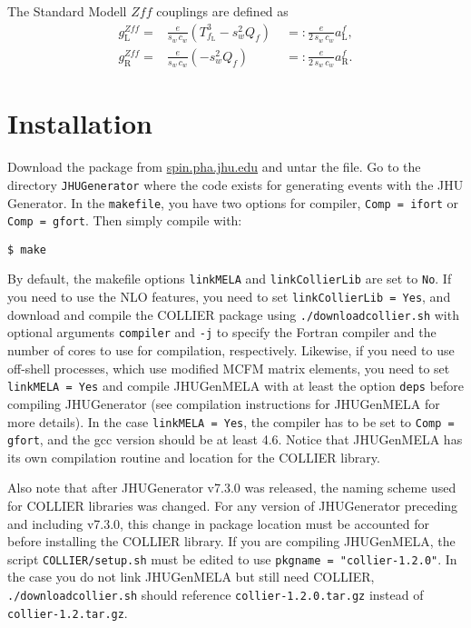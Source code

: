 \documentclass[aps,superscriptaddress,nofootinbib]{revtex4}
\begin{document}
The Standard Modell $Zff$ couplings are defined as 
\begin{eqnarray}
	g_\mathrm{L}^{Zff} =& \frac{e}{s_w \,c_w} \left( T^3_{f_\mathrm{L}} - s_w^2 Q_f \right)  \; &=: \frac{e}{2\, s_w\, c_w} a_\mathrm{L}^f, \nonumber \\
	g_\mathrm{R}^{Zff} =& \frac{e}{s_w \,c_w} \left( - s_w^2 Q_f \right)  \; &=: \frac{e}{2\, s_w\, c_w} a_\mathrm{R}^f. 
	\label{eq:def:Zff}
\end{eqnarray}

\section{Installation}

\noindent
Download the package from \url{spin.pha.jhu.edu} and untar the file.  Go to the directory \verb|JHUGenerator| where the code exists for generating events with the JHU Generator. In the \verb|makefile|, you have two options for compiler, \verb|Comp = ifort| or \verb|Comp = gfort|.  Then simply compile with:
\begin{verbatim}
$ make
\end{verbatim}

By default, the makefile options \verb|linkMELA| and \verb|linkCollierLib| are set to \verb|No|. If you need to use the NLO features, you need to set \verb|linkCollierLib = Yes|, and download and compile the COLLIER package using \verb|./downloadcollier.sh| with optional arguments \verb|compiler| and \verb|-j| to specify the Fortran compiler and the number of cores to use for compilation, respectively. Likewise, if you need to use off-shell processes, which use modified MCFM matrix elements, you need to set \verb|linkMELA = Yes| and compile JHUGenMELA with at least the option \verb|deps| before compiling JHUGenerator (see compilation instructions for JHUGenMELA for more details). In the case \verb|linkMELA = Yes|, the compiler has to be set to \verb|Comp = gfort|, and the gcc version should be at least 4.6. Notice that JHUGenMELA has its own compilation routine and location for the COLLIER library.

Also note that after JHUGenerator v7.3.0 was released, the naming scheme used for COLLIER libraries was changed. For any version of JHUGenerator preceding and including v7.3.0, this change in package location must be accounted for before installing the COLLIER library. If you are compiling JHUGenMELA, the script \verb|COLLIER/setup.sh| must be edited to use \verb|pkgname = "collier-1.2.0"|. In the case you do not link JHUGenMELA but still need COLLIER, \verb|./downloadcollier.sh| should reference \verb|collier-1.2.0.tar.gz| instead of \verb|collier-1.2.tar.gz|.
\end{document}
